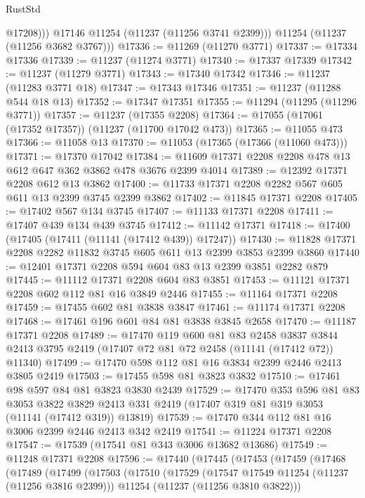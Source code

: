 \begin{lexlean}{RustStd}
\begin{coremodule}
              @17208)))
        @17146
        @11254
        (@11237 (@11256 @3741 @2399)))
      @11254
      (@11237 (@11256 @3682 @3767)))
@17336 := @11269 (@11270 @3771)
@17337 := @17334 @17336
@17339 := @11237 (@11274 @3771)
@17340 := @17337 @17339
@17342 := @11237 (@11279 @3771)
@17343 := @17340 @17342
@17346 := @11237 (@11283 @3771 @18)
@17347 := @17343 @17346
@17351 := @11237 (@11288 @544 @18 @13)
@17352 := @17347 @17351
@17355 := @11294 (@11295 (@11296 @3771))
@17357 := @11237 (@17355 @2208)
@17364 := @17055 (@17061 (@17352 @17357)) (@11237 (@11700 @17042 @473))
@17365 := @11055 @473
@17366 := @11058 @13
@17370 := @11053 (@17365 (@17366 (@11060 @473)))
@17371 := @17370 @17042
@17384 := @11609 @17371 @2208 @2208 @478 @13 @612 @647 @362 @3862 @478 @3676 @2399 @4014
@17389 := @12392 @17371 @2208 @612 @13 @3862
@17400 := @11733 @17371 @2208 @2282 @567 @605 @611 @13 @2399 @3745 @2399 @3862
@17402 := @11845 @17371 @2208
@17405 := @17402 @567 @134 @3745
@17407 := @11133 @17371 @2208
@17411 := @17407 @439 @134 @439 @3745
@17412 := @11142 @17371
@17418 := @17400 (@17405 (@17411 (@11141 (@17412 @439)) @17247))
@17430 := @11828 @17371 @2208 @2282 @11832 @3745 @605 @611 @13 @2399 @3853 @2399 @3860
@17440 := @12401 @17371 @2208 @594 @604 @83 @13 @2399 @3851 @2282 @879
@17445 := @11112 @17371 @2208 @604 @83 @3851
@17453 := @11121 @17371 @2208 @602 @112 @81 @16 @3849 @2446
@17455 := @11164 @17371 @2208
@17459 := @17455 @602 @81 @3838 @3847
@17461 := @11174 @17371 @2208
@17468 := @17461 @196 @601 @84 @81 @3838 @3845 @2658
@17470 := @11187 @17371 @2208
@17489 := @17470
    @119
    @600
    @81
    @83
    @2458
    @3837
    @3844
    @2413
    @3795
    @2419
    (@17407 @72 @81 @72 @2458 (@11141 (@17412 @72)) @11340)
@17499 := @17470 @598 @112 @81 @16 @3834 @2399 @2446 @2413 @3805 @2419
@17503 := @17455 @598 @81 @3823 @3832
@17510 := @17461 @98 @597 @84 @81 @3823 @3830 @2439
@17529 := @17470
    @353
    @596
    @81
    @83
    @3053
    @3822
    @3829
    @2413
    @331
    @2419
    (@17407 @319 @81 @319 @3053 (@11141 (@17412 @319)) @13819)
@17539 := @17470 @344 @112 @81 @16 @3006 @2399 @2446 @2413 @342 @2419
@17541 := @11224 @17371 @2208
@17547 := @17539 (@17541 @81 @343 @3006 @13682 @13686)
@17549 := @11248 @17371 @2208
@17596 := @17440
    (@17445
      (@17453
        (@17459
          (@17468
            (@17489
              (@17499
                (@17503
                  (@17510
                    (@17529
                      (@17547 @17549 @11254 (@11237 (@11256 @3816 @2399)))
                      @11254
                      (@11237 (@11256 @3810 @3822)))

\end{coremodule}
\end{lexlean}
